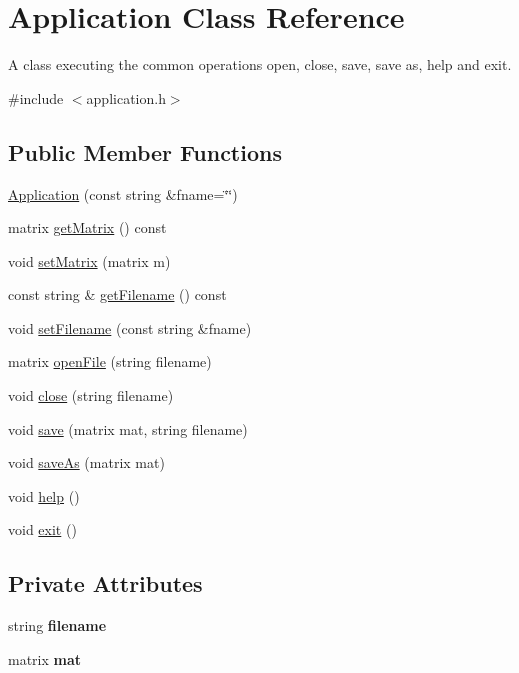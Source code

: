 \hypertarget{class_application}{}\section{Application Class Reference}
\label{class_application}


A class executing the common operations open, close, save, save as, help and exit.  




{\ttfamily \#include $<$application.\+h$>$}

\subsection*{Public Member Functions}
\begin{DoxyCompactItemize}
\item 
\hyperlink{class_application_ade4650e7378dae1d94794b86995fd571}{Application} (const string \&fname=\char`\"{}\char`\"{})
\item 
matrix \hyperlink{class_application_a67aeb617ca44a18045612d92f1d8afa0}{get\+Matrix} () const
\item 
void \hyperlink{class_application_a56b4a55e9eabd40b7f0033ba39631ebe}{set\+Matrix} (matrix m)
\item 
const string \& \hyperlink{class_application_a778575fb76de5352152d8928e1c3410f}{get\+Filename} () const
\item 
void \hyperlink{class_application_a76de879568ee39ac80484441716928d2}{set\+Filename} (const string \&fname)
\item 
matrix \hyperlink{class_application_ab2f161414a4e2f16e28321c192051006}{open\+File} (string filename)
\item 
void \hyperlink{class_application_a9909c3ed5d2e36680b8de11b21925bd5}{close} (string filename)
\item 
void \hyperlink{class_application_a533bb50380401b3a7bfaef31a9faf7f5}{save} (matrix mat, string filename)
\item 
void \hyperlink{class_application_a26cc9a5dcdf0eebb9e89f6b3a8fa64dd}{save\+As} (matrix mat)
\item 
void \hyperlink{class_application_a2c6518d7f121299d9be8c66d31997fbc}{help} ()
\item 
void \hyperlink{class_application_a3c8a98d6c10a5b054800488df16cdbcb}{exit} ()
\end{DoxyCompactItemize}
\subsection*{Private Attributes}
\begin{DoxyCompactItemize}
\item 
\mbox{\label{class_application_a3a20c3178562a91be951369d3356aabd}} 
string {\bfseries filename}
\item 
\mbox{\label{class_application_ae126cc1a7d1f29ad485ddd285dadf3a3}} 
matrix {\bfseries mat}
\end{DoxyCompactItemize}


